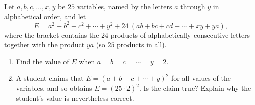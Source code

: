 Let $a,b,c,\dots,x,y$ be $25$ variables, named by the letters $a$ through $y$ in alphabetical order, and let
\[
E=a^2+b^2+c^2+\cdots+y^2+24\,(ab+bc+cd+\cdots+xy+ya),
\]
where the bracket contains the $24$ products of alphabetically consecutive letters together with the product $ya$ (so $25$ products in all).
\begin{enumerate}
\item[(a)] Find the value of $E$ when $a=b=c=\cdots=y=2$.
\item[(b)] A student claims that $E=(a+b+c+\cdots+y)^2$ for all values of the variables, and so obtains $E=(25\cdot2)^2$. Is the claim true? Explain why the student's value is nevertheless correct.
\end{enumerate}
